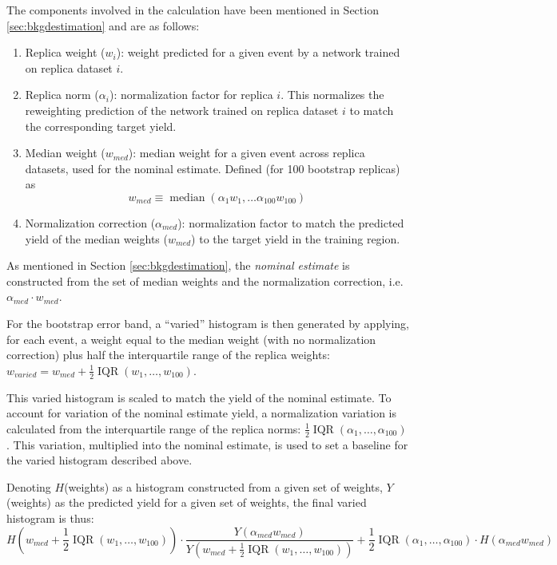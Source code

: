 The components involved in the calculation have been mentioned in Section \ref{sec:bkgdestimation} and 
are as follows:
\begin{enumerate}
\item Replica weight ($w_{i}$): weight predicted for a given event by a network trained on replica 
dataset $i$.
\item Replica norm ($\alpha_{i}$): normalization factor for replica $i$. This normalizes the reweighting 
prediction of the network trained on replica dataset $i$ to match the corresponding target yield.
\item Median weight ($w_{med}$): median weight for a given event across replica datasets, used for the nominal estimate. Defined (for 100 bootstrap replicas) as
\begin{equation}
w_{med} \equiv \operatorname{median}(\alpha_{1}w_{1}, \ldots \alpha_{100}w_{100})
\end{equation}
\item Normalization correction ($\alpha_{med}$): normalization factor to match the predicted yield of the median weights
($w_{med}$) to the target yield in the training region.
\end{enumerate}

As mentioned in Section \ref{sec:bkgdestimation}, the \emph{nominal estimate} is constructed from the set of
median weights and the normalization correction, i.e. $\alpha_{med}\cdot w_{med}$.

For the bootstrap error band, a ``varied'' histogram is then generated by applying, for each event, a weight
equal to the median weight (with no normalization correction) plus half the interquartile range of 
the replica weights: $w_{varied} = w_{med} + \frac{1}{2}\operatorname{IQR}(w_{1},\ldots, w_{100})$.

This varied histogram is scaled to match the yield of the nominal estimate. To account for variation of the 
nominal estimate yield, a normalization variation is calculated from the interquartile range of the replica norms:
$\frac{1}{2}\operatorname{IQR}(\alpha_{1}, \ldots, \alpha_{100})$. This variation, multiplied into the nominal
estimate, is used to set a baseline for the varied histogram described above.

Denoting $H$(weights) as a histogram constructed from a given set of weights, $Y$(weights) as the predicted yield
for a given set of weights, the final varied histogram is thus:
\begin{equation}
H(w_{med} +\frac{1}{2}\operatorname{IQR}(w_{1},\ldots, w_{100}))\cdot \frac{Y(\alpha_{med}w_{med})}{Y(w_{med} +\frac{1}{2}\operatorname{IQR}(w_{1},\ldots, w_{100}))} + \frac{1}{2}\operatorname{IQR}(\alpha_{1}, \ldots, \alpha_{100})\cdot H(\alpha_{med}w_{med})
\end{equation}

